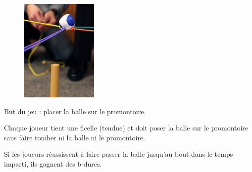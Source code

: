 \documentclass{grand-jeu}
\begin{document}
\begin{liste-materiel}
\end{liste-materiel}

\begin{regles}
\begin{figure}
\vspace{-1cm}
\includegraphics[height=5cm]{4-Solidaire-rouge/sources/76.png}
\end{figure}

But du jeu : placer la balle sur le promontoire.

Chaque joueur tient une ficelle (tendue) et doit poser la balle sur le promontoire sans faire tomber ni la balle ni le promontoire.

Si les joueurs réussissent à faire passer la balle jusqu'au bout dans le temps imparti, ils gagnent des b-dures.
\end{regles}


\begin{imaginaire}

\end{imaginaire}

\begin{moments-stop}
\end{moments-stop}
\end{document}
